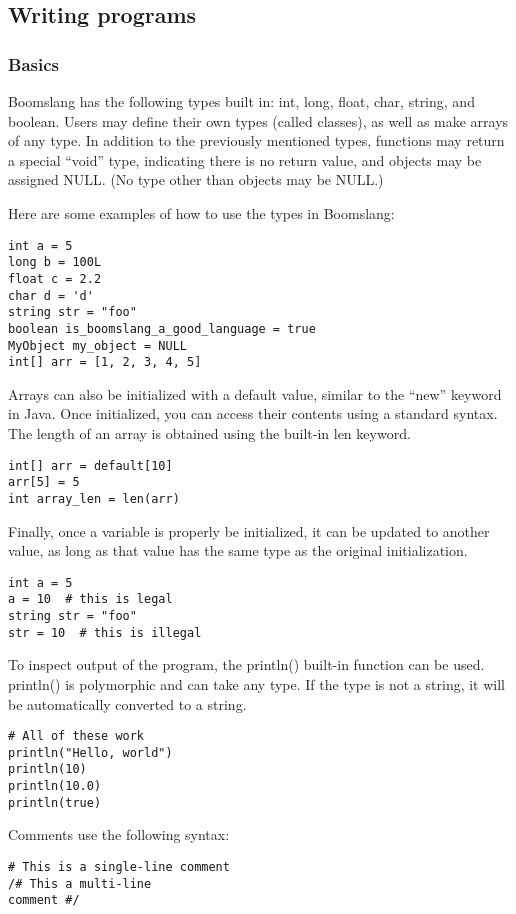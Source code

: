 \documentclass{article}
\begin{document}
\subsection{Writing programs}
\subsubsection{Basics}
Boomslang has the following types built in: int, long, float, char, string, and boolean. Users may define their own types (called classes), as well as make arrays of any type. In addition to the previously mentioned types, functions may return a special ``void'' type, indicating there is no return value, and objects may be assigned NULL. (No type other than objects may be NULL.)

Here are some examples of how to use the types in Boomslang:
\begin{verbatim}
int a = 5
long b = 100L
float c = 2.2
char d = 'd'
string str = "foo"
boolean is_boomslang_a_good_language = true
MyObject my_object = NULL
int[] arr = [1, 2, 3, 4, 5]
\end{verbatim}

Arrays can also be initialized with a default value, similar to the ``new'' keyword in Java. Once initialized, you can access their contents using a standard syntax. The length of an array is obtained using the built-in len keyword.
\begin{verbatim}
int[] arr = default[10]
arr[5] = 5
int array_len = len(arr)
\end{verbatim}

Finally, once a variable is properly be initialized, it can be updated to another value, as long as that value has the same type as the original initialization.
\begin{verbatim}
int a = 5
a = 10  # this is legal
string str = "foo"
str = 10  # this is illegal
\end{verbatim}

To inspect output of the program, the println() built-in function can be used. println() is polymorphic and can take any type. If the type is not a string, it will be automatically converted to a string.
\begin{verbatim}
# All of these work
println("Hello, world")
println(10)
println(10.0)
println(true)
\end{verbatim}

Comments use the following syntax:
\begin{verbatim}
# This is a single-line comment
/# This a multi-line
comment #/
\end{verbatim}
\end{document}
